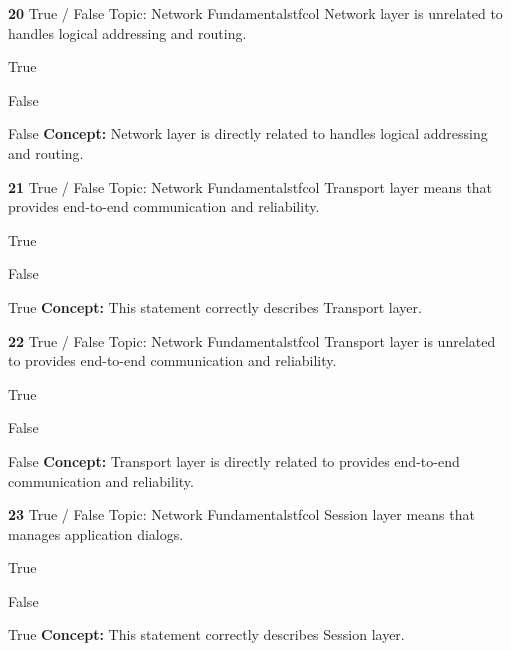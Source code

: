 \documentclass[10pt,a4paper]{article}
\begin{document}
\begin{qcard}{\color{white}\textbf{20} \hfill \small True / False \textbar{} Topic: Network Fundamentals}{tfcol}
Network layer is unrelated to handles logical addressing and routing.

\begin{qoptions}
\item True
\item False
\end{qoptions}
\begin{explainbox}{False}
\textbf{Concept:} Network layer is directly related to handles logical addressing and routing.
\end{explainbox}
\end{qcard}

\begin{qcard}{\color{white}\textbf{21} \hfill \small True / False \textbar{} Topic: Network Fundamentals}{tfcol}
Transport layer means that provides end-to-end communication and reliability.

\begin{qoptions}
\item True
\item False
\end{qoptions}
\begin{explainbox}{True}
\textbf{Concept:} This statement correctly describes Transport layer.
\end{explainbox}
\end{qcard}

\begin{qcard}{\color{white}\textbf{22} \hfill \small True / False \textbar{} Topic: Network Fundamentals}{tfcol}
Transport layer is unrelated to provides end-to-end communication and reliability.

\begin{qoptions}
\item True
\item False
\end{qoptions}
\begin{explainbox}{False}
\textbf{Concept:} Transport layer is directly related to provides end-to-end communication and reliability.
\end{explainbox}
\end{qcard}

\begin{qcard}{\color{white}\textbf{23} \hfill \small True / False \textbar{} Topic: Network Fundamentals}{tfcol}
Session layer means that manages application dialogs.

\begin{qoptions}
\item True
\item False
\end{qoptions}
\begin{explainbox}{True}
\textbf{Concept:} This statement correctly describes Session layer.
\end{explainbox}
\end{qcard}
\end{document}
